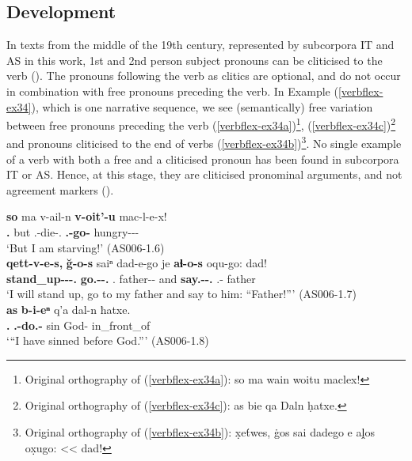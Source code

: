 \subsection{Development}

In texts from the middle of the 19th century, represented by subcorpora IT and AS in this work, 1st and 2nd person subject pronouns can be cliticised to the verb (\cites[55--56]{schiefner56}[280--283]{kojima19}). The pronouns following the verb as clitics are optional, and do not occur in combination with free pronouns preceding the verb. In Example (\ref{verbflex-ex34}), which is one narrative sequence, we see (semantically) free variation between free pronouns preceding the verb (\ref{verbflex-ex34a})\footnote{Original orthography of (\ref{verbflex-ex34a}): so ma wain woitu maclex!}, (\ref{verbflex-ex34c})\footnote{Original orthography of (\ref{verbflex-ex34c}): as bie qa Daln ḥatxe.} and pronouns cliticised to the end of verbs (\ref{verbflex-ex34b})\footnote{Original orthography of (\ref{verbflex-ex34b}): x̣e\'{t}wes, \.{g}os sai dadego e aḽos ox̣ugo: << dad!}. No single example of a verb with both a free and a cliticised pronoun has been found in subcorpora IT or AS. Hence, at this stage, they are cliticised pronominal arguments, and not agreement markers (\cite[283]{kojima19}).



\begin{exe}
	\ex\label{verbflex-ex34}
	\begin{xlist}
		
		
		\ex\label{verbflex-ex34a}
		\gll \textbf{so} ma v-ail-n \textbf{v-oit'-u} mac-l-e-x! \\
		\textbf{{\Fsg}.{\Nom}} but {\M}.{\Sg}-die-{\Ptcp}.{\Pst} \textbf{{\M}.{\Sg}-go-{\Npst}} hungry-{\Nmlz}-{\Obl}-{\Cont} \\
		\trans `But I am starving!'
		\hfill (AS006-1.6) \\
		
		\ex\label{verbflex-ex34b}
		\gll \textbf{qett-v-e-s,} \textbf{\u{g}-o-s} saiⁿ dad-e-go je \textbf{aɬ-o-s} oqu-go: dad!  \\
		\textbf{stand\_up-{\Npst}-{\Seq}-{\Fsg}.{\Erg}} \textbf{go.{\Pfv}-{\Npst}-{\Fsg}.{\Erg}} {\Fsg}.{\Gen} father-{\Obl}-{\All} and \textbf{say.{\Ipfv}-{\Npst}-{\Fsg}.{\Erg}} {\Dist}.{\Obl}-{\All} father \\
		\trans `I will stand up, go to my father and say to him: ``Father!{''}'
		\hfill (AS006-1.7) \\
		
		
		
		\ex\label{verbflex-ex34c}
		\gll \textbf{as} \textbf{b-i-eⁿ} q'a dal-n ħatxe. \\
		\textbf{{\Fsg}.{\Erg}} \textbf{{\B}.{\Sg}-do.{\Pfv}-{\Aor}} sin God-{\Dat} in\_front\_of \\
		\trans `{``}I have sinned before God.{''}'
		\hfill (AS006-1.8)
		
		
	\end{xlist}
\end{exe}

